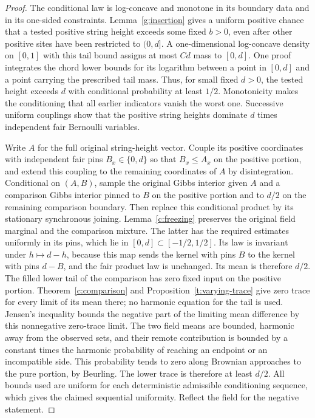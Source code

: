 \begin{proof}
The conditional law is log-concave and monotone in its boundary data and
in its one-sided constraints. Lemma~\ref{g:insertion} gives a uniform
positive chance that a tested positive string height exceeds some
fixed \(b>0\), even after other positive sites have been restricted to
\((0,d]\). A one-dimensional log-concave density on \([0,1]\) with this
tail bound assigns at most \(C d\) mass to \([0,d]\). One proof integrates
the chord lower bounds for its logarithm between a point in \([0,d]\)
and a point carrying the prescribed tail mass. Thus, for small fixed
\(d>0\), the tested height exceeds \(d\) with conditional probability at
least \(1/2\). Monotonicity makes the conditioning that all earlier
indicators vanish the worst one. Successive uniform couplings show that
the positive string heights dominate \(d\) times independent fair
Bernoulli variables.

Write $A$ for the full original string-height vector. Couple its positive
coordinates with independent fair pins $B_x\in\{0,d\}$ so that
$B_x\le A_x$ on the positive portion, and extend this coupling to the
remaining coordinates of $A$ by disintegration. Conditional on $(A,B)$,
sample the original Gibbs interior given $A$ and a comparison Gibbs
interior pinned to $B$ on the positive portion and to $d/2$ on the
remaining comparison boundary. Then replace this conditional product
by its stationary synchronous joining. Lemma~\ref{c:freezing} preserves
the original field marginal and the comparison mixture. The latter has
the required estimates uniformly in its pins, which lie in
$[0,d]\subset[-1/2,1/2]$. Its law is invariant under
$h\mapsto d-h$, because this map sends the kernel with pins $B$ to
the kernel with pins $d-B$, and the fair product law is unchanged.
Its mean is therefore $d/2$. The filled lower tail of the comparison
has zero fixed input on the positive portion. Theorem~\ref{c:comparison}
and Proposition~\ref{t:varying-trace} give zero trace for every limit
of its mean there; no harmonic equation for the tail is used.
Jensen's inequality bounds the negative part of the limiting mean
difference by this nonnegative zero-trace limit. The two field means are
bounded, harmonic away from the observed sets, and their remote
contribution is bounded by a constant times the harmonic probability of
reaching an endpoint or an incompatible side. This probability tends to
zero along Brownian approaches to the pure portion, by Beurling.
The lower trace is therefore at least \(d/2\). All bounds used are
uniform for each deterministic admissible conditioning sequence, which
gives the claimed sequential uniformity. Reflect the field for the
negative statement.
\end{proof}

